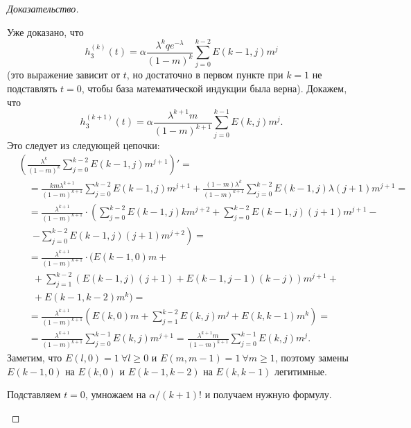 \documentclass[12pt, specialist, subf, substylefile = spbu.rtx]{disser}
\begin{document}
\begin{proof}[Доказательство]
\begin{enumerate}
			Уже доказано, что
			\[
			h _3 ^{(k)} (t) = \alpha \frac {\lambda ^k q e ^{-\lambda}} {(1 - m) ^k} \sum \limits _{j = 0} ^{k - 2} E(k - 1, j) m ^j
			\]
			(это выражение зависит от $t$, но достаточно в первом пункте при $k = 1$ не подставлять $t = 0$, чтобы база математической индукции была верна). Докажем, что
			\[
			h _3 ^{(k + 1)} (t) = \alpha \frac {\lambda ^{k + 1} m} {(1 - m) ^{k + 1}} \sum \limits _{j = 0} ^{k - 1} E(k, j) m ^j.
			\]
			Это следует из следующей цепочки:
			\[
				\begin{aligned}
					&\left(\frac {\lambda ^k} {(1 - m) ^k} \sum \limits _{j = 0} ^{k - 2} E(k - 1, j) m ^{j + 1}\right)' =\\
					&\quad = \frac {km\lambda ^{k + 1}} {(1 - m) ^{k + 1}} \sum \limits _{j = 0} ^{k - 2} E(k - 1, j) m ^{j + 1} + \frac {(1 - m)\lambda ^k} {(1 - m) ^{k + 1}} \sum \limits _{j = 0} ^{k - 2} E(k - 1, j) \lambda (j + 1) m ^{j + 1} =\\
					&\quad = \frac {\lambda ^{k + 1}} {(1 - m) ^{k + 1}} \cdot \left(\sum \limits _{j = 0} ^{k - 2} E(k - 1, j) k m ^{j + 2} + \sum \limits _{j = 0} ^{k - 2} E(k - 1, j) (j + 1) m ^{j + 1} -
					\right.\\
					&\quad~~\left. - \sum \limits _{j = 0} ^{k - 2} E(k - 1, j) (j + 1) m ^{j + 2}\right) =\\
					&\quad = \frac {\lambda ^{k + 1}} {(1 - m) ^{k + 1}} \cdot \Bigg(E(k - 1, 0) m +\\
					&\quad~~ + \sum \limits _{j = 1} ^{k - 2} \left(E(k - 1, j) (j + 1) +E(k - 1, j - 1) (k - j)\right) m ^{j + 1} +\\
					&\quad~~ + E(k - 1, k - 2) m ^k\Bigg) =\\
					&\quad = \frac {\lambda ^{k + 1}} {(1 - m) ^{k + 1}} \left(E(k, 0) m + \sum \limits _{j = 1} ^{k - 2} E(k, j) m ^j + E(k, k - 1) m ^k \right) =\\
					&\quad = \frac {\lambda ^{k + 1}} {(1 - m) ^{k + 1}} \sum \limits _{j = 0} ^{k - 1} E(k, j) m ^{j + 1} = \frac {\lambda ^{k + 1} m} {(1 - m) ^{k + 1}} \sum \limits _{j = 0} ^{k - 1} E(k, j) m ^j.
				\end{aligned}
			\]
			Заметим, что $E(l, 0) = 1~ \forall l \geqslant 0$ и $E(m, m - 1) = 1~ \forall m \geqslant 1$, поэтому замены $E(k - 1, 0)$ на $E(k, 0)$ и $E(k - 1, k - 2)$ на $E(k, k - 1)$ легитимные.
			
			Подставляем $t = 0$, умножаем на $\alpha / (k + 1)!$ и получаем нужную формулу.
		\end{enumerate}
	\end{proof}
\end{document}
